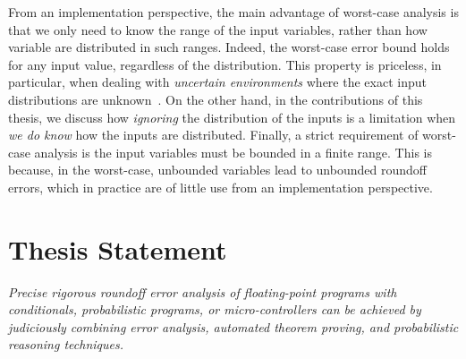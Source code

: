 %
From an implementation perspective, the main advantage of worst-case analysis is that we only need to know the range of the input variables, rather than how variable are distributed in such ranges. 
%
Indeed, the worst-case error bound holds for any input value, regardless of the distribution.
%
%
This property is priceless, in particular, when dealing with \emph{uncertain environments} where the exact input distributions are unknown~\cite{robotrisk}.
%
On the other hand, in the contributions of this thesis, we discuss how \emph{ignoring} the distribution of the inputs is a limitation when \emph{we do know} how the inputs are distributed.
%
Finally, a strict requirement of worst-case analysis is the input variables must be bounded  in a finite range. This is because, in the worst-case, unbounded variables lead to unbounded roundoff errors, which in practice are of little use from an implementation perspective.
%
\section{Thesis Statement}
%

%
\emph{
Precise rigorous roundoff error analysis of floating-point programs with conditionals, probabilistic programs, or micro-controllers can be achieved by judiciously combining error analysis, automated theorem proving, and probabilistic reasoning techniques.
%
%	
%
%
%
%
%
}

